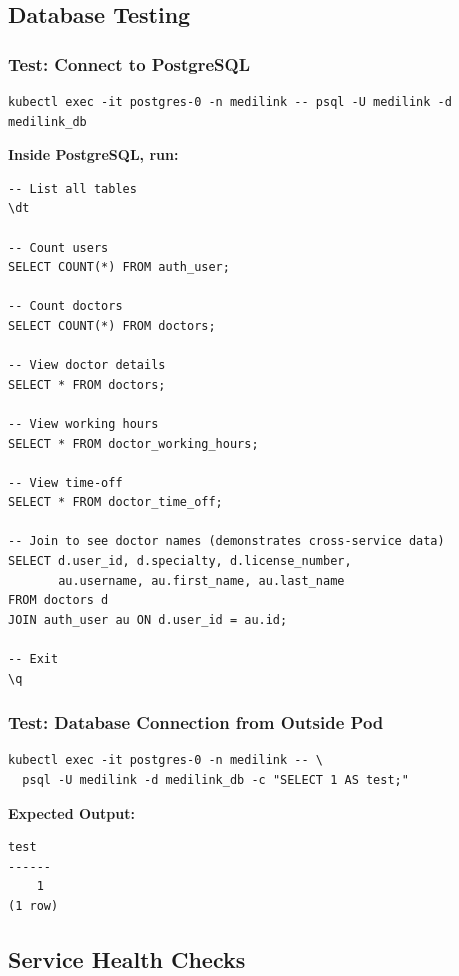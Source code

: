 \documentclass[12pt,a4paper]{article}
\begin{document}
\subsection{Database Testing}

\subsubsection{Test: Connect to PostgreSQL}
\begin{lstlisting}[style=bash]
kubectl exec -it postgres-0 -n medilink -- psql -U medilink -d medilink_db
\end{lstlisting}

\textbf{Inside PostgreSQL, run:}
\begin{lstlisting}[style=bash]
-- List all tables
\dt

-- Count users
SELECT COUNT(*) FROM auth_user;

-- Count doctors
SELECT COUNT(*) FROM doctors;

-- View doctor details
SELECT * FROM doctors;

-- View working hours
SELECT * FROM doctor_working_hours;

-- View time-off
SELECT * FROM doctor_time_off;

-- Join to see doctor names (demonstrates cross-service data)
SELECT d.user_id, d.specialty, d.license_number,
       au.username, au.first_name, au.last_name
FROM doctors d
JOIN auth_user au ON d.user_id = au.id;

-- Exit
\q
\end{lstlisting}

\subsubsection{Test: Database Connection from Outside Pod}
\begin{lstlisting}[style=bash]
kubectl exec -it postgres-0 -n medilink -- \
  psql -U medilink -d medilink_db -c "SELECT 1 AS test;"
\end{lstlisting}

\textbf{Expected Output:}
\begin{lstlisting}[style=bash]
 test
------
    1
(1 row)
\end{lstlisting}

\subsection{Service Health Checks}
\end{document}
